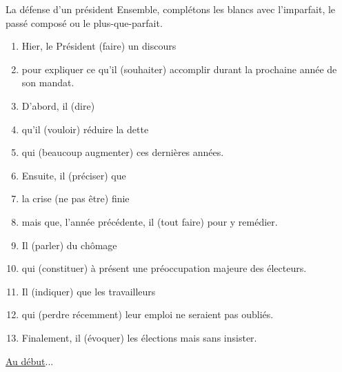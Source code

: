 \begin{frame}{La défense d'un président}
  \scriptsize
  Ensemble, complétons les blancs avec l'\alert{imparfait}, le \alert{passé composé} ou le \alert{plus-que-parfait}.
  \begin{enumerate}
    \item Hier, le Président \underline{} (faire) un discours
    \item pour expliquer ce qu'il \underline{} (souhaiter) accomplir durant la prochaine année de son mandat.
    \item D'abord, il \underline{} (dire)
    \item qu'il \underline{} (vouloir) réduire la dette
    \item qui \underline{} (beaucoup augmenter) ces dernières années.
    \item Ensuite, il \underline{} (préciser) que
    \item la crise \underline{} (ne pas être) finie
    \item mais que, l'année précédente, il \underline{} (tout faire) pour y remédier.
    \item Il \underline{} (parler) du chômage
    \item qui \underline{} (constituer) à présent une préoccupation majeure des électeurs.
    \item Il \underline{} (indiquer) que les travailleurs
    \item qui \underline{} (perdre récemment) leur emploi ne seraient pas oubliés.
    \item Finalement, il \underline{} (évoquer) les élections mais sans insister.
  \end{enumerate}
  \raggedleft
  \hyperlink{début}{Au début}...
\end{frame}
